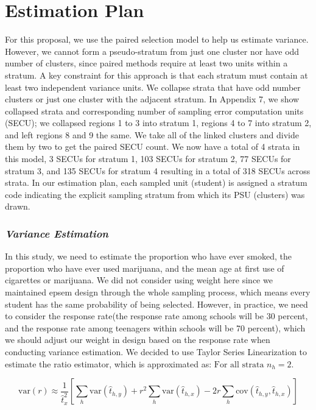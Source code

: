 \documentclass[
  12pt]{article}
\begin{document}
\section{Estimation Plan}\label{estimation-plan}

For this proposal, we use the paired selection model to help us estimate
variance. However, we cannot form a pseudo-stratum from just one cluster
nor have odd number of clusters, since paired methods require at least
two units within a stratum. A key constraint for this approach is that
each stratum must contain at least two independent variance units. We
collapse strata that have odd number clusters or just one cluster with
the adjacent stratum. In Appendix 7, we show collapsed strata and
corresponding number of sampling error computation units (SECU); we
collapsed regions 1 to 3 into stratum 1, regions 4 to 7 into stratum 2,
and left regions 8 and 9 the same. We take all of the linked clusters
and divide them by two to get the paired SECU count. We now have a total
of 4 strata in this model, 3 SECUs for stratum 1, 103 SECUs for stratum
2, 77 SECUs for stratum 3, and 135 SECUs for stratum 4 resulting in a
total of 318 SECUs across strata. In our estimation plan, each sampled
unit (student) is assigned a stratum code indicating the explicit
sampling stratum from which its PSU (clusters) was drawn.

\subsubsection{\texorpdfstring{\emph{Variance
Estimation}}{Variance Estimation}}\label{variance-estimation}

In this study, we need to estimate the proportion who have ever smoked,
the proportion who have ever used marijuana, and the mean age at first
use of cigarettes or marijuana. We did not consider using weight here
since we maintained epsem design through the whole sampling process,
which means every student has the same probability of being selected.
However, in practice, we need to consider the response rate(the response
rate among schools will be 30 percent, and the response rate among
teenagers within schools will be 70 percent), which we should adjust our
weight in design based on the response rate when conducting variance
estimation. We decided to use Taylor Series Linearization to estimate
the ratio estimator, which is approximated as:
\(\text{For all strata } n_h = 2\).

\[
\text{var}(r) \approx \frac{1}{\hat{t}_x^2} \left[ \sum_h \text{var}(\hat{t}_{h,y}) + r^2 \sum_h \text{var}(\hat{t}_{h,x}) - 2r \sum_h \text{cov}(\hat{t}_{h,y}, \hat{t}_{h,x}) \right]
\]
\end{document}
